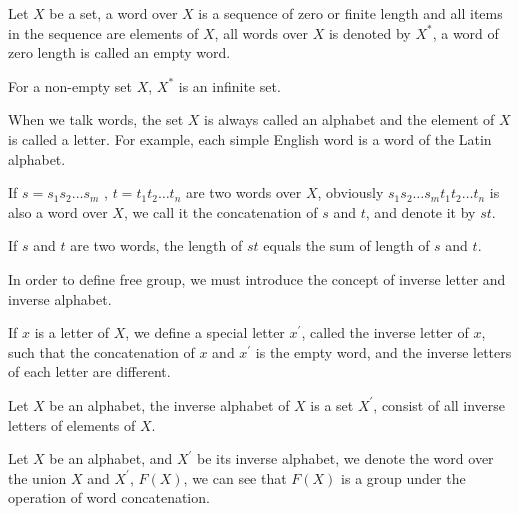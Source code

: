 \begin{defi}[word]
Let $X$ be a set, a word over $X$ is a sequence of zero or finite length and all items in the sequence are elements of $X$, all words over $X$ is denoted by $X^\ast$, a word of zero length is called an empty word.
\end{defi}
\begin{pro}
For a non-empty set $X$, $X^\ast$ is an infinite set.
\end{pro}
When we talk words, the set $X$ is always called an alphabet and the element of $X$ is called a letter. For example, each simple English word is a word of the Latin alphabet.
\begin{defi}
If $s=s_1s_2 \dots s_m$ , $t=t_1t_2 \dots t_n$ are two words over $X$, obviously $s_1s_2 \dots s_mt_1t_2 \dots t_n$ is also a word over $X$, we call it the concatenation of $s$ and $t$, and denote it by $st$.
\end{defi}
\begin{pro}
If $s$ and $t$ are two words, the length of $st$ equals the sum of length of $s$ and $t$.
\end{pro}
In order to define free group, we must introduce the concept of inverse letter and inverse alphabet.
\begin{defi}
If $x$ is a letter of $X$, we define a special letter $x^\prime$, called the inverse letter of $x$, such that the concatenation of $x$ and $x^\prime$ is the empty word, and the inverse letters of each letter are different.
\end{defi}
\begin{defi}
Let $X$ be an alphabet, the inverse alphabet of $X$ is a set $X^\prime$, consist of all inverse letters of elements of $X$.
\end{defi}
\begin{defi}
Let $X$ be an alphabet, and $X^\prime$ be its inverse alphabet, we denote the word over the union $X$ and $X^\prime$, $F(X)$, we can see that $F(X)$ is a group under the operation of word concatenation.
\end{defi}
